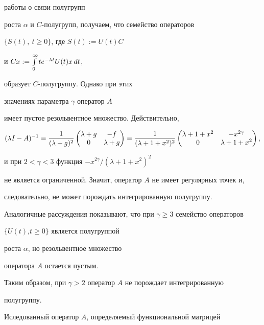 работы \cite{Miyadera} о связи полугрупп


роста $\alpha$ и $C$-полугрупп, получаем, что семейство операторов


$\{S(t),\ t\geq 0\}$, где $S(t):=U(t)C$


и $Cx:=\int\limits^{\infty}_{0}te^{-\lambda t}U(t)x\,dt$,


образует $C$-полугруппу. Однако при этих 


значениях параметра $\gamma$ оператор $A$


имеет пустое резольвентное множество. Действительно,


$$


(\l I -A)^{-1}=


\frac{1}{(\lambda +g)^2} \begin{pmatrix} \lambda +g & -f \\ 0


& \lambda +g  \end{pmatrix}


=\frac{1}{(\lambda +1+x^2)^2}


\begin{pmatrix} \lambda +1+x^2 & -x^{2\gamma} \\ 0 & \lambda +1+x^2


\end{pmatrix},


$$


и при $2<\gamma<3$ функция $-x^{2\gamma}/(\lambda +1+x^2)^2$


не является ограниченной. Значит, оператор $A$ не имеет регулярных точек и,


следовательно, не может порождать интегрированную полугруппу.





Аналогичные рассуждения показывают, что при $\gamma\geq3$ семейство операторов


$\{U(t)$,\linebreak $t\geq 0\}$ является  полугруппой 


роста $\alpha$, но резольвентное множество


оператора $A$ остается пустым.


Таким образом, при $\gamma>2$ оператор $A$ не порождает интегрированную


полугруппу.





Иследованный оператор $A$, определяемый функциональной матрицей


